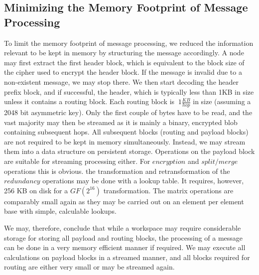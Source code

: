 \subsection{Minimizing the Memory Footprint of Message Processing}
To limit the memory footprint of message processing, we reduced the information relevant to be kept in memory by structuring the message accordingly. A node may first extract the first header block, which is equivalent to the block size of the cipher used to encrypt the header block. If the message is invalid due to a non-existent message, we may stop there. We then start decoding the header prefix block, and if successful, the header, which is typically less than 1KB in size unless it contains a routing block. Each routing block is $~1 \frac{KB}{hop}$ in size (assuming a 2048 bit asymmetric key). Only the first couple of bytes have to be read, and the vast majority may then be streamed as it is mainly a binary, encrypted blob containing subsequent hops. All subsequent blocks (routing and payload blocks) are not required to be kept in memory simultaneously. Instead, we may stream them into a data structure on persistent storage. Operations on the payload block are suitable for streaming processing either. For $encryption$ and $split/merge$ operations this is obvious. the transformation and retransformation of the $redundancy$ operations may be done with a lookup table. It requires, however, 256 KB on disk for a $GF(2^{16})$ transformation. The matrix operations are comparably small again as they may be carried out on an element per element base with simple, calculable lookups. 

We may, therefore, conclude that while a workspace may require considerable storage for storing all payload and routing blocks, the processing of a message can be done in a very memory efficient manner if required. We may execute all calculations on payload blocks in a streamed manner, and all blocks required for routing are either very small or may be streamed again.
